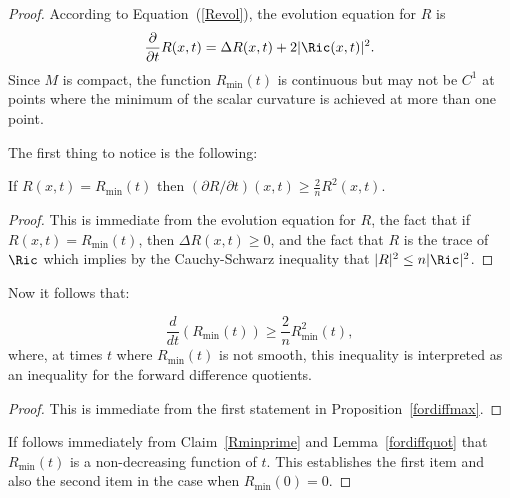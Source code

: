 \begin{proof}
According to Equation~(\ref{Revol}), the evolution equation for $R$
is
$$\frac{\partial}{\partial t}R(x,t)=\Delta
R(x,t)+2|\Ric(x,t)|^2.$$ Since $M$ is compact, the function
$R_\mathrm{min}(t)$ is continuous but may not be $C^1$ at points where
the minimum of the scalar curvature is achieved at more than one
point.

The first thing to notice is the following:

\begin{claim}
\label{claim:scalar-min-derivative-bound}
\label{firstclaim}  If $R(x,t)=R_\mathrm{min}(t)$ then $(\partial R/\partial t)(x,t)\ge \frac{2}{n}R^2(x,t)$.
\end{claim}

\begin{proof}
This is immediate from  the evolution equation for $R$, the fact
that if $R(x,t)=R_\mathrm{min}(t)$, then $\Delta R(x,t)\ge 0$, and the
fact that $R$ is the trace of $\Ric$ which implies by the
Cauchy-Schwarz inequality that $|R|^2\le n|\Ric|^2$.
\end{proof}


Now it follows that:

\begin{claim}
\label{claim:scalar-min-forward-difference}
\label{Rminprime}
$$\frac{d}{d t}(R_\mathrm{min}(t))\ge \frac{2}{n}R_\mathrm{min}^2(t),$$
where, at times $t$ where $R_\mathrm{min}(t)$ is not smooth, this
inequality is interpreted as an inequality for the forward
difference quotients.
\end{claim}


\begin{proof}
This is immediate from the first statement in
Proposition~\ref{fordiffmax}.
\end{proof}





If follows immediately from Claim~\ref{Rminprime} and
Lemma~\ref{fordiffquot} that $R_\mathrm{min}(t)$ is a non-decreasing
function of $t$. This establishes the first item and also the second
item in the case when $R_\mathrm{min}(0)=0$.


\end{proof}
